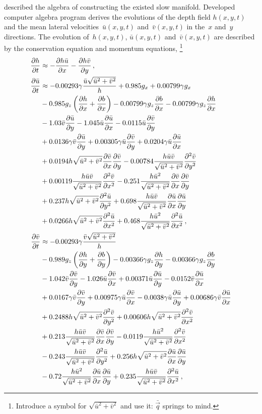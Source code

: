 \documentclass[12pt,a5paper]{article}
\newcommand{\uu}{{\bar u}}
\newcommand{\vv}{{\bar v}}
\newcommand{\qq}{{\bar{\vec q}}}
\begin{document}
\cite{Roberts:2008fk} described the algebra of constructing the existed slow manifold. Developed computer algebra program derives the evolutions of the depth field $h(x,y,t)$ and the mean lateral velocities~$\bar u(x,y,t)$ and~$\bar v(x,y,t)$ in the~$x$ and~$y$ directions. The evolution of~$h(x,y,t)$, $\bar u(x,y,t)$ and~$\bar v(x,y,t)$ are described by the conservation equation and momentum equations,
\footnote{Introduce a symbol for $\sqrt{\uu^2+\vv^2}$ and use it: $\qq$ springs to mind.}
\begin{align}
\frac{\partial h}{\partial t}&
\approx-\frac{\partial h\bar u}{\partial x}-\frac{\partial h\bar v}{\partial y}\,,\label{smag:h}
\\
\frac{\partial\bar u}{\partial t}&
\approx-0.00293\gamma\frac{\bar u\sqrt{\bar u^2+\bar v^2}}{h}+0.985g_x+0.00799\gamma g_x
\nonumber\\&
-0.985g_z\left(\frac{\partial h}{\partial x}+\frac{\partial b}{\partial x}\right)-0.00799\gamma g_z\D xb
-0.00799\gamma g_z\D xh
\nonumber\\&
-1.03\bar v\frac{\partial\bar u}{\partial y}-1.045\bar u\frac{\partial\bar u}{\partial x}-0.0115\uu\D{y}{\vv}
\nonumber\\&
+0.0136\gamma\vv\D{y}{\uu}+0.00305\gamma\uu\D{y}{\vv}+0.0204\gamma\uu\D{x}{\uu}
\nonumber\\&
+0.0194h\sqrt{\uu^2+\vv^2}\D x\vv\D y\vv-0.00784\frac{h\uu\vv}{\sqrt{\uu^2+\vv^2}}\DD{y}{\vv}
\nonumber\\&
+0.00119\frac{h\uu\vv}{\sqrt{\uu^2+\vv^2}}\DD x\vv-0.251\frac{h\uu^2}{\sqrt{\uu^2+\vv^2}}\D x\vv\D y\vv
\nonumber\\&
+0.237h\sqrt{\uu^2+\vv^2}\DD y\uu+0.698\frac{h\uu\vv}{\sqrt{\uu^2+\vv^2}}\D x\uu\D y\uu
\nonumber\\&
+0.0266h\sqrt{\uu^2+\vv^2}\DD x\uu+0.468\frac{h\uu^2}{\sqrt{\uu^2+\vv^2}}\DD x\uu\,,
\label{smag:u}
\\
\frac{\partial\bar v}{\partial t}&
\approx-0.00293\gamma\frac{\bar v\sqrt{\bar u^2+\bar v^2}}{h}
\nonumber\\&
-0.989g_z\left(\frac{\partial h}{\partial y}+\frac{\partial b}{\partial y}\right)
-0.00366\gamma g_z\D yh-0.00366\gamma g_z\D yb
\nonumber\\&
-1.042\bar v\frac{\partial\bar v}{\partial y}-1.026\bar u\frac{\partial\bar v}{\partial x}
+0.00371\uu\D y\uu-0.0152\vv\D x\uu
\nonumber\\&
+0.0167\gamma\vv\D y\vv+0.00975\gamma\uu\D x\vv-0.0038\gamma\uu\D y\uu+0.00686\gamma\vv\D x\uu
\nonumber\\&
+0.2488h\sqrt{\uu^2+\vv^2}\DD y\vv+0.00606h\sqrt{\uu^2+\vv^2}\DD x\vv
\nonumber\\&
+0.213\frac{h\uu\vv}{\sqrt{\uu^2+\vv^2}}\D x\vv\D y\vv-0.0119\frac{h\uu^2}{\sqrt{\uu^2+\vv^2}}\DD x\vv
\nonumber\\&
-0.243\frac{h\uu\vv}{\sqrt{\uu^2+\vv^2}}\DD y\uu+0.256h\sqrt{\uu^2+\vv^2}\D x\uu\D y\uu
\nonumber\\&
-0.72\frac{h\uu^2}{\sqrt{\uu^2+\vv^2}}\D x\uu\D y\uu+0.235\frac{h\uu\vv}{\sqrt{\uu^2+\vv^2}}\DD x\uu
\,,\label{smag:v}
\end{align}
\end{document}
